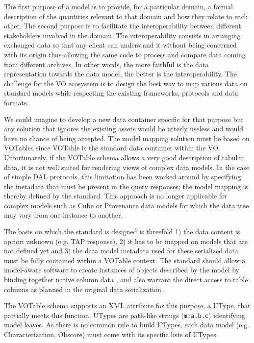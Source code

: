 
The first purpose of a model is to provide, for a particular domain, a formal description of the quantities relevant to that domain and how they relate to each other.
The second purpose is to facilitate the interoperability between  different stakeholders involved in the domain. The interoperability consists in arranging exchanged data 
so that any client can understand it without being concerned with its origin thus allowing the same code to process and compare data coming from different archives.  
In other words, the more faithful is the data representation towards the data model, the better is the interoperability.
The challenge for the VO ecosystem is to design the best way to map various data on standard models while respecting the existing frameworks, protocols and data formats.

We could imagine to develop a new data container specific for that purpose but any solution that ignores the existing assets would be utterly useless and would have no chance of being accepted.
The model mapping solution must be based on VOTables since VOTable  \citep{2019ivoa.spec.1021O} is the standard data container within the VO.
Unfortunately, if the VOTable schema allows a very good description of tabular data, it is not well suited for rendering views of complex data models.
In the case of simple DAL protocols, this limitation has been worked around by specifying the metadata that must be present in the query responses; the model mapping is thereby defined by the standard.
This approach is no longer applicable for complex models such as Cube or Provenance data models for which the data tree may vary from one instance to another.

The basis on which the standard is designed is threefold 1) the data content is apriori unknown (e.g. TAP response), 2) it has to be mapped on models that are not defined yet and 3) the data model metadata used for these serialized data must be fully contained within a VOTable context.
The  standard should allow a model-aware software to create instances of objects described by the model by binding together native column data , and also warrant the direct access to table columns as planned in the original data serialization.


The VOTable schema supports an XML attribute for this purpose, a UType, that partially meets this function. 
UTypes are path-like strings (\texttt{m:a.b.c}) identifying model leaves. As there is no common rule to build UTypes,  each data model (e.g. Characterization, Obscore)  must come with its specific lists of UTypes. 

